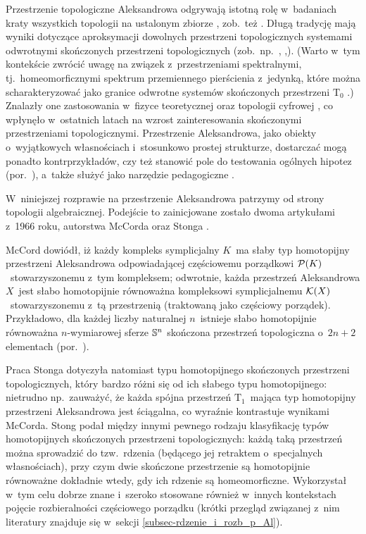 Przestrzenie topologiczne Aleksandrowa odgrywają istotną rolę w~badaniach kraty wszystkich topologii na ustalonym zbiorze \cite{Steiner66,Watson94}, zob.~też \cite{Uzcategui05}. Długą tradycję mają wyniki dotyczące aproksymacji dowolnych przestrzeni topologicznych systemami odwrotnymi skończonych przestrzeni topologicznych (zob.~np.~\cite{Alexandroff47,Bandt92,Clader09,Flachsmeyer61,Kopperman05, Kopperman09,Shiraki76}, \cite[Chapter 49, Section 11]{Pearl07},\cite[p.~414]{Nagata85}). (Warto w~tym kontekście zwrócić uwagę na związek z~przestrzeniami spektralnymi, tj.~homeomorficznymi spektrum przemiennego pierścienia z~jedynką, które można scharakteryzować jako granice odwrotne systemów skończonych przestrzeni $\mathrm{T_0}$ \cite{Hochster69}.) Znalazły one zastosowania w~fizyce teoretycznej \cite{Sorkin91} oraz topologii cyfrowej \cite{Kopperman03,Kopperman05}, co wpłynęło w~ostatnich latach na wzrost zainteresowania skończonymi przestrzeniami topologicznymi. Przestrzenie Aleksandrowa, jako obiekty o~wyjątkowych własnościach i~stosunkowo prostej strukturze, dostarczać mogą ponadto kontrprzykładów, czy też stanowić pole do testowania ogólnych hipotez (por.~\cite{Kukiela09,Kukiela13a,Barmak}), a~także służyć jako narzędzie pedagogiczne \cite{Helmstutler12,May}.

W~niniejszej rozprawie na przestrzenie Aleksandrowa patrzymy od strony topologii algebraicznej. Podejście to zainicjowane zostało dwoma artykułami z~1966 roku, autorstwa McCorda \cite{McCord66} oraz Stonga \cite{Stong66}. 

McCord \cite{McCord66} dowiódł, iż każdy kompleks symplicjalny $K$~ma słaby typ homotopijny przestrzeni Aleksandrowa odpowiadającej częściowemu porządkowi $\mP(K)$~stowarzyszonemu z~tym kompleksem; odwrotnie, każda przestrzeń Aleksandrowa $X$~jest słabo homotopijnie równoważna kompleksowi symplicjalnemu $\mK(X)$~stowarzyszonemu z~tą przestrzenią (traktowaną jako częściowy porządek). Przykładowo, dla każdej liczby naturalnej $n$~istnieje słabo homotopijnie równoważna $n$-wymiarowej sferze $\S^n$ skończona przestrzeń topologiczna o~$2n+2$ elementach (por.~\cite[Theorem 2.13]{Barmak07}). 

Praca Stonga \cite{Stong66} dotyczyła natomiast typu homotopijnego skończonych przestrzeni topologicznych, który bardzo różni się od ich słabego typu homotopijnego: nietrudno np.~zauważyć, że każda spójna przestrzeń $\mathrm{T_1}$~mająca typ homotopijny przestrzeni Aleksandrowa jest ściągalna, co wyraźnie kontrastuje wynikami McCorda. Stong \cite{Stong66} podał między innymi pewnego rodzaju klasyfikację typów homotopijnych skończonych przestrzeni topologicznych: każdą taką przestrzeń można sprowadzić do tzw.~rdzenia (będącego jej retraktem o~specjalnych własnościach), przy czym dwie skończone przestrzenie są homotopijnie równoważne dokładnie wtedy, gdy ich rdzenie są homeomorficzne. Wykorzystał w~tym celu dobrze znane i~szeroko stosowane również w~innych kontekstach pojęcie rozbieralności częściowego porządku (krótki przegląd związanej z~nim literatury znajduje się w~sekcji \ref{subsec-rdzenie_i_rozb_p_Al}).


